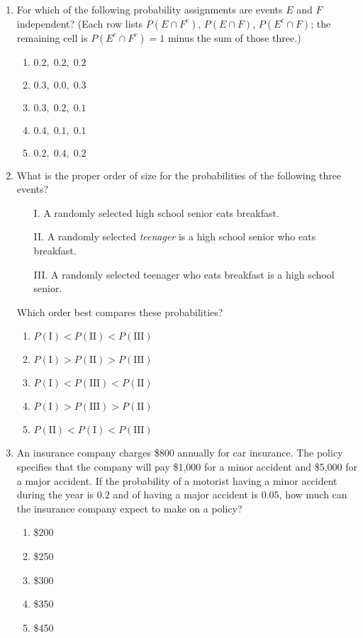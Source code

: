 \documentclass{article}
\begin{document}
\begin{enumerate}[label=\textbf{S\arabic*.}]
\item For which of the following probability assignments are events $E$ and $F$
independent? (Each row lists $P(E\cap F^{c})$, $P(E\cap F)$, $P(E^{c}\cap F)$;
the remaining cell is $P(E^{c}\cap F^{c})=1$ minus the sum of those three.)
\begin{enumerate}
  \item $0.2,\;0.2,\;0.2$
  \item $0.3,\;0.0,\;0.3$
  \item $0.3,\;0.2,\;0.1$
  \item $0.4,\;0.1,\;0.1$
  \item $0.2,\;0.4,\;0.2$
\end{enumerate}

\item What is the proper order of size for the probabilities of the following three events?
\begin{itemize}
  \item[I.] A randomly selected high school senior eats breakfast.
  \item[II.] A randomly selected \emph{teenager} is a high school senior who eats breakfast.
  \item[III.] A randomly selected teenager who eats breakfast is a high school senior.
\end{itemize}
Which order best compares these probabilities?
\begin{enumerate}
  \item $P(\text{I})<P(\text{II})<P(\text{III})$
  \item $P(\text{I})>P(\text{II})>P(\text{III})$
  \item $P(\text{I})<P(\text{III})<P(\text{II})$
  \item $P(\text{I})>P(\text{III})>P(\text{II})$
  \item $P(\text{II})<P(\text{I})<P(\text{III})$
\end{enumerate}

\item An insurance company charges \$800 annually for car insurance. The policy specifies that the company will pay \$1,000 for a minor accident and \$5,000 for a major accident. If the probability of a motorist having a minor accident during the year is $0.2$ and of having a major accident is $0.05$, how much can the insurance company expect to make on a policy? 
\begin{enumerate}
  \item \$200
  \item \$250
  \item \$300
  \item \$350
  \item \$450
\end{enumerate}


\end{enumerate}
\end{document}
